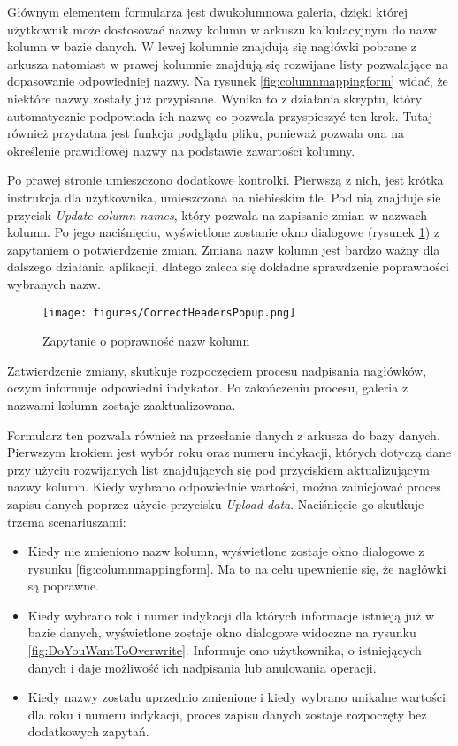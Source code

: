 Głównym elementem formularza jest dwukolumnowa galeria, dzięki której użytkownik może dostosować nazwy kolumn w arkuszu kalkulacyjnym do nazw kolumn w bazie danych. W lewej kolumnie znajdują się nagłówki pobrane z arkusza natomiast w prawej kolumnie znajdują się rozwijane listy pozwalające na dopasowanie odpowiedniej nazwy. Na rysunek \ref{fig:columnmappingform} widać, że niektóre nazwy zostały już przypisane. Wynika to z działania skryptu, który automatycznie podpowiada ich nazwę co pozwala przyspieszyć ten krok. Tutaj również przydatna jest funkcja podglądu pliku, ponieważ pozwala ona na określenie prawidłowej nazwy na podstawie zawartości kolumny.

Po prawej stronie umieszczono dodatkowe kontrolki. Pierwszą z nich, jest krótka instrukcja dla użytkownika, umieszczona na niebieskim tle.
Pod nią znajduje sie przycisk \emph{Update column names}, który pozwala na zapisanie zmian w nazwach kolumn. Po jego naciśnięciu, wyświetlone zostanie okno dialogowe (rysunek \ref{fig:CorrectHeadersPopup}) z zapytaniem o potwierdzenie zmian. Zmiana nazw kolumn jest bardzo ważny dla dalszego działania aplikacji, dlatego zaleca się dokładne sprawdzenie poprawności wybranych nazw.
\begin{figure}[h]
    \centering
    \texttt{[image: figures/CorrectHeadersPopup.png]}
    \caption{Zapytanie o poprawność nazw kolumn}
    \label{fig:CorrectHeadersPopup}
\end{figure}
Zatwierdzenie zmiany, skutkuje rozpoczęciem procesu nadpisania nagłówków, oczym informuje odpowiedni indykator. Po zakończeniu procesu, galeria z nazwami kolumn zostaje zaaktualizowana.

Formularz ten pozwala również na przesłanie danych z arkusza do bazy danych. Pierwszym krokiem jest wybór roku oraz numeru indykacji, których dotyczą dane przy użyciu rozwijanych list znajdujących się pod przyciskiem aktualizującym nazwy kolumn. Kiedy wybrano odpowiednie wartości, można zainicjować proces zapisu danych poprzez użycie przycisku \emph{Upload data}. Naciśnięcie go skutkuje trzema scenariuszami:
\begin{itemize}
    \item Kiedy nie zmieniono nazw kolumn, wyświetlone zostaje okno dialogowe z rysunku \ref{fig:columnmappingform}. Ma to na celu upewnienie się, że nagłówki są poprawne.
    \item Kiedy wybrano rok i numer indykacji dla których informacje istnieją już w bazie danych, wyświetlone zostaje okno dialogowe widoczne na rysunku \ref{fig:DoYouWantToOverwrite}. Informuje ono użytkownika, o istniejących danych i daje możliwość ich nadpisania lub anulowania operacji.
    \item Kiedy nazwy zostału uprzednio zmienione i kiedy wybrano unikalne wartości dla roku i numeru indykacji, proces zapisu danych zostaje rozpoczęty bez dodatkowych zapytań.
\end{itemize}

